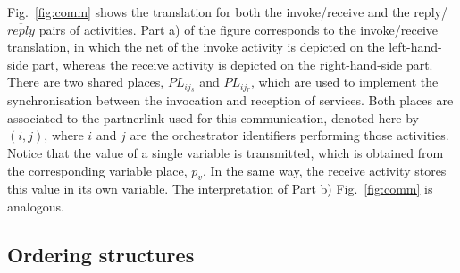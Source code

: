 \begin{itemize}
Fig.~\ref{fig:comm} shows the translation for both the invoke/receive and the reply/$\overline{reply}$ pairs of activities. Part a) of the figure corresponds to the invoke/receive translation, in which the net of the invoke activity is depicted on the left-hand-side part, whereas the receive activity is depicted on the right-hand-side part. There are two shared places, $PL_{ij{_s}}$ and $PL_{ij{_r}}$, which are used to implement the synchronisation between the invocation and reception of services. Both places are associated to the partnerlink used for this communication, denoted here by $(i,j)$, where $i$ and $j$ are the orchestrator identifiers performing those activities. Notice that the value of a single variable is transmitted, which is obtained from the corresponding variable place, $p_v$. In the same way, the receive activity stores this value in its own variable. The interpretation of Part b) Fig.~\ref{fig:comm} is analogous.  
\end{itemize}
%
\subsection*{Ordering structures}

